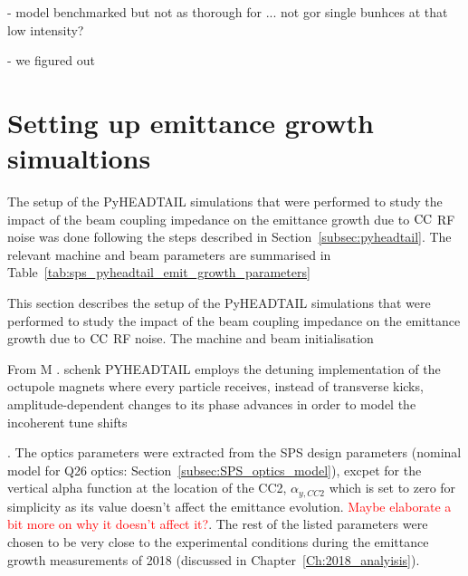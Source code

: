 - model benchmarked but not as thorough for ... not gor single bunhces at that low intensity?

- we figured out


\section{Setting up emittance growth simualtions}
The setup of the PyHEADTAIL simulations that were performed to study the impact of the beam coupling impedance on the emittance growth due to ${\mathrm{CC}}$ RF noise was done following the steps described in Section~\ref{subsec:pyheadtail}. The relevant machine and beam parameters are summarised in Table~\ref{tab:sps_pyheadtail_emit_growth_parameters}


This section describes the setup of the PyHEADTAIL simulations that were performed to study the impact of the beam coupling impedance on the emittance growth due to ${\mathrm{CC}}$ RF noise. The machine and beam initialisation


From M . schenk
PYHEADTAIL employs the detuning implementation of the octupole magnets where
every particle receives, instead of transverse kicks, amplitude-dependent changes to its phase advances in order to model the incoherent tune shifts



. The optics parameters were extracted from the SPS design parameters (nominal model for Q26 optics: Section~\ref{subsec:SPS_optics_model}), excpet for the vertical alpha function at the location of the CC2, $\alpha_{y, CC2}$ which is set to zero for simplicity as its value doesn't affect the emittance evolution. \textcolor{red}{Maybe elaborate a bit more on why it doesn't affect it?}. The rest of the listed parameters were chosen to be very close to the experimental conditions during the emittance growth measurements of 2018 (discussed in Chapter~\ref{Ch:2018_analyisis}).


